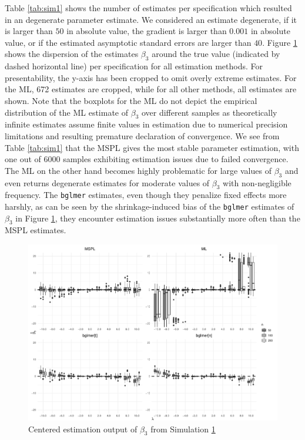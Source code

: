 \documentclass[11pt, a4paper]{article}
\theoremstyle{example} \newtheorem{example}{Example}[section]
\theoremstyle{theorem} \newtheorem{theorem}{Theorem}[section]
\theoremstyle{theorem }\newtheorem{proposition}{Proposition}[section]
\theoremstyle{theorem }\newtheorem{corollary}{Corollary}[section]
\begin{document}
Table \ref{tab:sim1} shows the number of estimates per specification which resulted in an degenerate parameter estimate. We considered an estimate degenerate, if it is larger than $50$ in absolute value, the gradient is larger than $0.001$ in absolute value, or if the estimated asymptotic standard errors are larger than $40$. Figure \ref{fig:sim1} shows the dispersion of the estimates ${\beta}_3$ around the true value (indicated by dashed horizontal line) per specification for all estimation methods. For presentability, the y-axis has been cropped to omit overly extreme estimates. For the ML, 672 estimates are cropped, while  for all other methods, all estimates are shown. Note that the boxplots for the ML do not depict the empirical distribution of the ML estimate of $\beta_3$ over different samples as theoretically infinite estimates assume finite values in estimation due to numerical precision limitations and resulting premature declaration of convergence. We see from Table \ref{tab:sim1} that the MSPL gives the most stable parameter estimation, with one out of 6000 samples exhibiting estimation issues due to failed convergence. The ML on the other hand becomes highly problematic for large values of $\beta_3$ and even returns degenerate estimates for moderate values of $\beta_3$ with non-negligible frequency. The \texttt{bglmer} estimates, even though they penalize fixed effects more harshly, as can be seen by the shrinkage-induced bias of the \texttt{bglmer} estimates of $\beta_3$ in Figure \ref{fig:sim1}, they encounter estimation issues substantially more often than the MSPL estimates. 
\begin{figure}[H]
	\begin{center}
		\includegraphics[width=\textwidth]{Figures/sim1.pdf}
	\end{center}
	\caption{Centered estimation output of $\beta_3$ from Simulation \hyperref[sec:sim1]{1}}
	\label{fig:sim1}
\end{figure}
\end{document}
